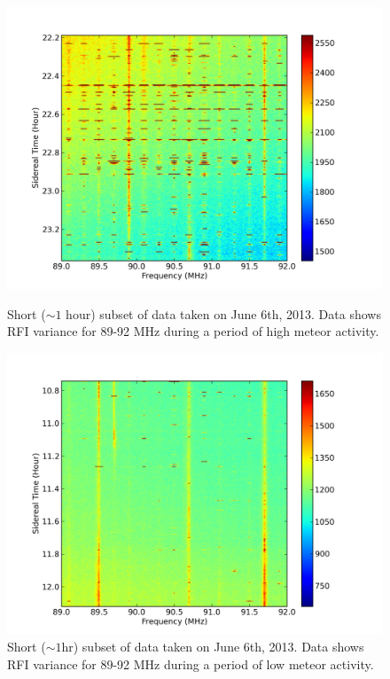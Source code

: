 \begin{figure}[htb]
\centering
\begin{minipage}[b]{0.48\textwidth}
\centering
\includegraphics[width=0.95\linewidth]{Data_analysis/figures/June_06_part_13_unmasked_FM_waterfall.png}
\caption{Short ($\sim1$ hour) subset of data taken on June 6th, 2013. Data shows RFI variance for 89-92 MHz during a period of high meteor activity. }
\label{Fig:RFI_wf_short_full}
\end{minipage}%
\begin{minipage}[b]{0.02\textwidth}
\hspace{1cm}
\end{minipage}%
\begin{minipage}[b]{0.48\textwidth}
\centering
\includegraphics[width=0.95\linewidth]{Data_analysis/figures/June_06_part_5_unmasked_FM_waterfall.png}
\caption{Short ($\sim1$hr) subset of data taken on June 6th, 2013. Data shows RFI variance for 89-92 MHz during a period of low meteor activity.}
\label{Fig:RFI_wf_short_empty}
\end{minipage}
\end{figure}

